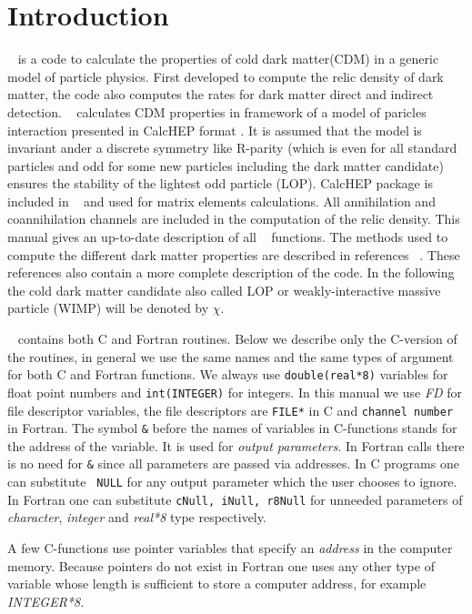 \documentclass[12pt,a4paper]{article}
\begin{document}
\section{Introduction}
\micro~ is a code 
 to calculate the properties of cold dark matter(CDM)  in a generic model of particle physics.  
 First developed to compute the relic density of dark matter, 
 the code also computes the rates for dark matter direct and  indirect detection. 
 \micro~ calculates CDM properties in framework of a model of paricles
 interaction presented in CalcHEP format \cite{Pukhov:2004ca}. 
 It is assumed that the model is invariant ander  a discrete symmetry like R-parity (which is even for 
all standard particles and odd for some new particles including the dark matter candidate) ensures 
the stability of the lightest  odd particle (LOP).  CalcHEP
 package is included in \micro~ and used for matrix elements calculations.
All annihilation and coannihilation channels are included in the computation of the relic density. 
This manual gives an up-to-date description of all \micro~ functions.  
The methods used to compute the different dark matter properties are described 
in references 
~\cite{Belanger:2001fz,Belanger:2004yn,Belanger:2006is,Belanger:2008sj,Belanger:2010gh,Belanger:2013oya}.
These references also contain  a more complete description of the code. In the following
the cold dark matter candidate also called LOP or weakly-interactive massive particle (WIMP)
will be denoted by $\chi$. 

\micro~ contains both C and Fortran routines. Below we describe only the
C-version of the routines,  in general we use the same  names
 and the same types of argument for both  C and Fortran functions. 
We always use \verb|double(real*8)| variables for float point numbers and 
\verb|int(INTEGER)| for integers. In this manual we use {\it FD} for  file descriptor 
variables, the file descriptors  are  \verb|FILE*| in C and {\tt channel number} in Fortran. 
The symbol \verb|&| before the names of variables in C-functions stands for 
the address of the variable. It is used for  {\it output
parameters}. In Fortran calls there is no need for \verb|&|
since  all parameters are passed via addresses. In C programs one  can substitute {\tt
NULL} for any output parameter which the user chooses to ignore. In Fortran  one
can substitute {\tt cNull, iNull, r8Null} for unneeded
parameters of  {\it character}, {\it integer}  and {\it real*8}  type respectively.  

A few C-functions use pointer variables that specify an {\it address} in 
the computer memory. Because pointers do not exist in  Fortran one uses any
other type of variable whose length is sufficient to store a computer address, for example {\it INTEGER*8}.
\end{document}
